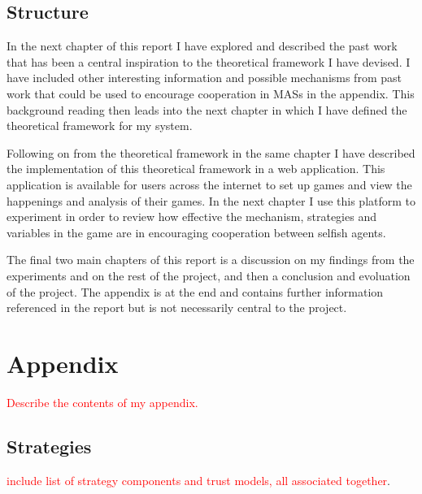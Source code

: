 \documentclass[]{final_report}
\begin{document}
\section{Structure}
In the next chapter of this report I have explored and described the past work that has been a central inspiration to the theoretical framework I have devised. I have included other interesting information and possible mechanisms from past work that could be used to encourage cooperation in MASs in the appendix. This background reading then leads into the next chapter in which I have defined the theoretical framework for my system.\par
Following on from the theoretical framework in the same chapter I have described the implementation of this theoretical framework in a web application. This application is available for users across the internet to set up games and view the happenings and analysis of their games. In the next chapter I use this platform to experiment in order to review how effective the mechanism, strategies and variables in the game are in encouraging cooperation between selfish agents.\par
The final two main chapters of this report is a discussion on my findings from the experiments and on the rest of the project, and then a conclusion and evoluation of the project. The appendix is at the end and contains further information referenced in the report but is not necessarily central to the project.

\newpage
{}

\label{endpage}

\chapter{Appendix}
\label{appendix}
\textcolor{red}{Describe the contents of my appendix.}
\section{Strategies}
\label{appendix:strats}
\textcolor{red}{include list of strategy components and trust models, all associated together}.
\end{document}

